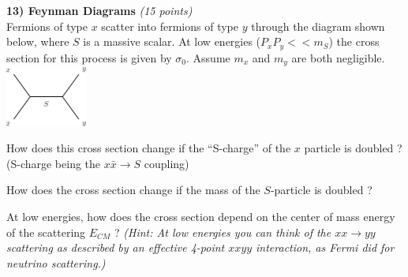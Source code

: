 {\textbf{13) Feynman Diagrams }\hfill \textit{(15 points)}\\
Fermions of type $x$ scatter into fermions of type $y$ through the diagram shown below, where $S$ is a massive scalar. 
At low energies ($P_x P_y << m_S$) the cross section for this process is given by $\sigma_0$.
Assume $m_x$ and $m_y$ are both negligible. 
\bc
\includegraphics[width=0.2\textwidth]{./xxToyy.pdf}
\ec
\bi
\item[a)] How does this cross section change if the ``S-charge'' of the $x$ particle is doubled ? \\ (S-charge being the $x\bar{x} \rightarrow S$ coupling) 
\vspace*{1.5in}
\item[b)] How does the cross section change if the mass of the $S$-particle is doubled ?
\vspace*{1.5in}
\item[c)] At low energies, how does the cross section depend on the center of mass energy of the scattering $E_{CM}$ ? 
\textit{(Hint: At low energies you can think of the $xx \rightarrow yy$ scattering as described by an effective 4-point $xxyy$ interaction, as Fermi did for neutrino scattering.)}
\ei




%


}
